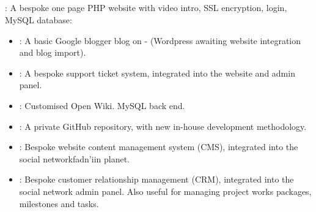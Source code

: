 \documentclass[letterpaper,10pt,openany,oneside,english]{sphinxmanual}
\begin{document}
\subsection{}
\label{\detokenize{overview:front-end}}
: A bespoke one page PHP website with video intro, SSL encryption, login, MySQL database: 
\begin{itemize}
\item {} 
: A basic Google blogger blog on  - (Wordpress awaiting website integration and blog import).

\item {} 
:   A bespoke support ticket system, integrated into the website and admin panel.

\item {} 
: Customised Open Wiki. MySQL back end.

\item {} 
: A private GitHub repository, with new in-house development methodology.

\item {} 
: Bespoke website content management system (CMS), integrated into the social networkfadn’iin planet.

\item {} 
: Bespoke customer relationship management (CRM), integrated into the social network admin panel. Also useful for managing project works packages, milestones and tasks.

\end{itemize}
\end{document}
